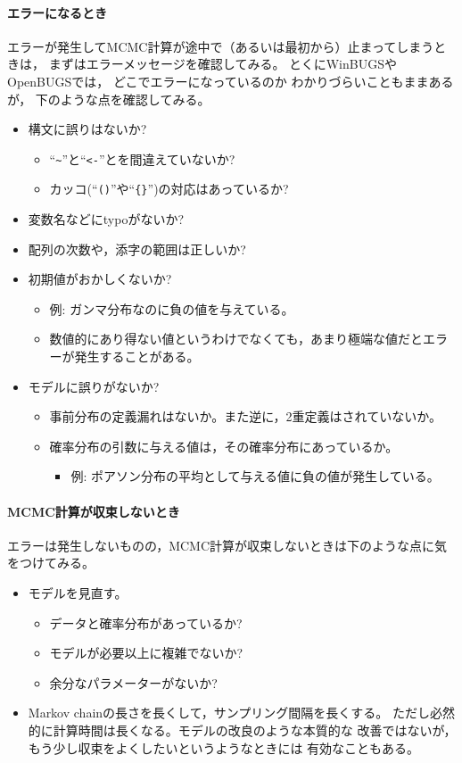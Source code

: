 \documentclass[11pt,uplatex]{jsarticle}
\begin{document}
\paragraph{エラーになるとき}
エラーが発生してMCMC計算が途中で（あるいは最初から）止まってしまうときは，
まずはエラーメッセージを確認してみる。
とくに\textsf{WinBUGS}や\textsf{OpenBUGS}では，
どこでエラーになっているのか わかりづらいこともままあるが，
下のような点を確認してみる。
\begin{itemize}
\item 構文に誤りはないか? 
\begin{itemize}
\item ``\texttt{\textasciitilde}''と``\texttt{<-}''とを間違えていないか?
\item カッコ(``\texttt{()}''や``\texttt{\{\}}'')の対応はあっているか?
\end{itemize}
\item 変数名などにtypoがないか?
\item 配列の次数や，添字の範囲は正しいか?
\item 初期値がおかしくないか?
\begin{itemize}
\item 例: ガンマ分布なのに負の値を与えている。
\item 数値的にあり得ない値というわけでなくても，あまり極端な値だとエラーが発生することがある。
\end{itemize}
\item モデルに誤りがないか?
\begin{itemize}
\item 事前分布の定義漏れはないか。また逆に，2重定義はされていないか。
\item 確率分布の引数に与える値は，その確率分布にあっているか。
\begin{itemize}
\item 例: ポアソン分布の平均として与える値に負の値が発生している。
\end{itemize}
\end{itemize}
\end{itemize}

\paragraph{MCMC計算が収束しないとき}
エラーは発生しないものの，MCMC計算が収束しないときは下のような点に気をつけてみる。
\begin{itemize}
\item モデルを見直す。
\begin{itemize}
\item データと確率分布があっているか?
\item モデルが必要以上に複雑でないか?
\item 余分なパラメーターがないか?
\end{itemize}
\item Markov chainの長さを長くして，サンプリング間隔を長くする。
  ただし必然的に計算時間は長くなる。モデルの改良のような本質的な
  改善ではないが，もう少し収束をよくしたいというようなときには
  有効なこともある。
\end{itemize}
\end{document}
